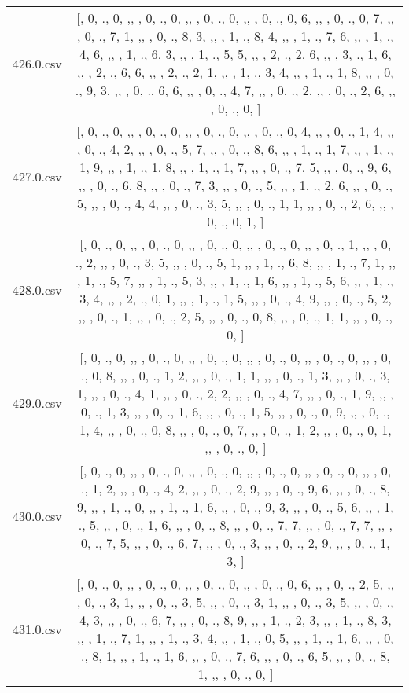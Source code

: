 \begin{table}[ht]
\begin{tabular}{@{}c c@{}}
	426.0.csv & [, 0, ., 0, ,,  , 0, ., 0, ,,  , 0, ., 0, ,,  , 0, ., 0, 6, ,,  , 0, ., 0, 7, ,,  , 0, ., 7, 1, ,,  , 0, ., 8, 3, ,,  , 1, ., 8, 4, ,,  , 1, ., 7, 6, ,,  , 1, ., 4, 6, ,,  , 1, ., 6, 3, ,,  , 1, ., 5, 5, ,,  , 2, ., 2, 6, ,,  , 3, ., 1, 6, ,,  , 2, ., 6, 6, ,,  , 2, ., 2, 1, ,,  , 1, ., 3, 4, ,,  , 1, ., 1, 8, ,,  , 0, ., 9, 3, ,,  , 0, ., 6, 6, ,,  , 0, ., 4, 7, ,,  , 0, ., 2, ,,  , 0, ., 2, 6, ,,  , 0, ., 0, ]\\ 
	427.0.csv & [, 0, ., 0, ,,  , 0, ., 0, ,,  , 0, ., 0, ,,  , 0, ., 0, 4, ,,  , 0, ., 1, 4, ,,  , 0, ., 4, 2, ,,  , 0, ., 5, 7, ,,  , 0, ., 8, 6, ,,  , 1, ., 1, 7, ,,  , 1, ., 1, 9, ,,  , 1, ., 1, 8, ,,  , 1, ., 1, 7, ,,  , 0, ., 7, 5, ,,  , 0, ., 9, 6, ,,  , 0, ., 6, 8, ,,  , 0, ., 7, 3, ,,  , 0, ., 5, ,,  , 1, ., 2, 6, ,,  , 0, ., 5, ,,  , 0, ., 4, 4, ,,  , 0, ., 3, 5, ,,  , 0, ., 1, 1, ,,  , 0, ., 2, 6, ,,  , 0, ., 0, 1, ]\\ 
	428.0.csv & [, 0, ., 0, ,,  , 0, ., 0, ,,  , 0, ., 0, ,,  , 0, ., 0, ,,  , 0, ., 1, ,,  , 0, ., 2, ,,  , 0, ., 3, 5, ,,  , 0, ., 5, 1, ,,  , 1, ., 6, 8, ,,  , 1, ., 7, 1, ,,  , 1, ., 5, 7, ,,  , 1, ., 5, 3, ,,  , 1, ., 1, 6, ,,  , 1, ., 5, 6, ,,  , 1, ., 3, 4, ,,  , 2, ., 0, 1, ,,  , 1, ., 1, 5, ,,  , 0, ., 4, 9, ,,  , 0, ., 5, 2, ,,  , 0, ., 1, ,,  , 0, ., 2, 5, ,,  , 0, ., 0, 8, ,,  , 0, ., 1, 1, ,,  , 0, ., 0, ]\\ 
	429.0.csv & [, 0, ., 0, ,,  , 0, ., 0, ,,  , 0, ., 0, ,,  , 0, ., 0, ,,  , 0, ., 0, ,,  , 0, ., 0, 8, ,,  , 0, ., 1, 2, ,,  , 0, ., 1, 1, ,,  , 0, ., 1, 3, ,,  , 0, ., 3, 1, ,,  , 0, ., 4, 1, ,,  , 0, ., 2, 2, ,,  , 0, ., 4, 7, ,,  , 0, ., 1, 9, ,,  , 0, ., 1, 3, ,,  , 0, ., 1, 6, ,,  , 0, ., 1, 5, ,,  , 0, ., 0, 9, ,,  , 0, ., 1, 4, ,,  , 0, ., 0, 8, ,,  , 0, ., 0, 7, ,,  , 0, ., 1, 2, ,,  , 0, ., 0, 1, ,,  , 0, ., 0, ]\\ 
	430.0.csv & [, 0, ., 0, ,,  , 0, ., 0, ,,  , 0, ., 0, ,,  , 0, ., 0, ,,  , 0, ., 0, ,,  , 0, ., 1, 2, ,,  , 0, ., 4, 2, ,,  , 0, ., 2, 9, ,,  , 0, ., 9, 6, ,,  , 0, ., 8, 9, ,,  , 1, ., 0, ,,  , 1, ., 1, 6, ,,  , 0, ., 9, 3, ,,  , 0, ., 5, 6, ,,  , 1, ., 5, ,,  , 0, ., 1, 6, ,,  , 0, ., 8, ,,  , 0, ., 7, 7, ,,  , 0, ., 7, 7, ,,  , 0, ., 7, 5, ,,  , 0, ., 6, 7, ,,  , 0, ., 3, ,,  , 0, ., 2, 9, ,,  , 0, ., 1, 3, ]\\ 
	431.0.csv & [, 0, ., 0, ,,  , 0, ., 0, ,,  , 0, ., 0, ,,  , 0, ., 0, 6, ,,  , 0, ., 2, 5, ,,  , 0, ., 3, 1, ,,  , 0, ., 3, 5, ,,  , 0, ., 3, 1, ,,  , 0, ., 3, 5, ,,  , 0, ., 4, 3, ,,  , 0, ., 6, 7, ,,  , 0, ., 8, 9, ,,  , 1, ., 2, 3, ,,  , 1, ., 8, 3, ,,  , 1, ., 7, 1, ,,  , 1, ., 3, 4, ,,  , 1, ., 0, 5, ,,  , 1, ., 1, 6, ,,  , 0, ., 8, 1, ,,  , 1, ., 1, 6, ,,  , 0, ., 7, 6, ,,  , 0, ., 6, 5, ,,  , 0, ., 8, 1, ,,  , 0, ., 0, ]\\ 

\end{tabular}
\end{table}
